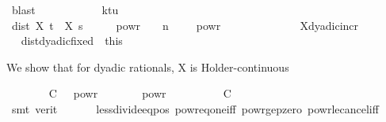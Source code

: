\begin{isabellebody}
\ blast\isanewline
\ \ \ \ \ \ \ \ \isamarkupfalse%
\ \isamarkupfalse%
\ {\isachardoublequoteopen}k{\isacharunderscore}{\kern0pt}tu\ {\isacharequal}{\kern0pt}\ {}{\isachardoublequoteclose}\ \isamarkupfalse%
\isanewline
\ \ \ \ \ \ \ \ \isamarkupfalse%
\ {\isachardoublequoteopen}dist\ {\isacharparenleft}{\kern0pt}X\ t\ {\isasymomega}{\isacharparenright}{\kern0pt}\ {\isacharparenleft}{\kern0pt}X\ s\ {\isasymomega}{\isacharparenright}{\kern0pt}\ {\isasymle}\ {}\ {\isacharasterisk}{\kern0pt}\ {}\ powr\ {\isacharparenleft}{\kern0pt}{\isacharminus}{\kern0pt}\ {\isasymgamma}\ {\isacharasterisk}{\kern0pt}\ n{\isacharparenright}{\kern0pt}\ {\isacharslash}{\kern0pt}\ {\isacharparenleft}{\kern0pt}{}\ {\isacharminus}{\kern0pt}\ {}\ powr\ {\isacharminus}{\kern0pt}\ {\isasymgamma}{\isacharparenright}{\kern0pt}{\isachardoublequoteclose}\isanewline
\ \ \ \ \ \ \ \ \ \ \isamarkupfalse%
\ X{\isacharunderscore}{\kern0pt}dyadic{\isacharunderscore}{\kern0pt}incr\ \isamarkupfalse%
\isanewline
\ \ \ \ \ \ \isacommand{{\isacharbraceright}{\kern0pt}}\isamarkupfalse%
\ \isamarkupfalse%
\ dist{\isacharunderscore}{\kern0pt}dyadic{\isacharunderscore}{\kern0pt}fixed\ {\isacharequal}{\kern0pt}\ this%
\begin{isamarkuptext}%
We show that for dyadic rationals, X is Holder-continuous%
\end{isamarkuptext}\isamarkuptrue%
\ \ \ \ \ \ \isamarkupfalse%
\ {\isacharquery}{\kern0pt}C\ {\isacharequal}{\kern0pt}\ {\isachardoublequoteopen}{}\ powr\ {\isacharparenleft}{\kern0pt}{}\ {\isacharplus}{\kern0pt}\ {\isasymgamma}{\isacharparenright}{\kern0pt}\ {\isacharslash}{\kern0pt}\ {\isacharparenleft}{\kern0pt}{}\ {\isacharminus}{\kern0pt}\ {}\ powr\ {\isacharminus}{\kern0pt}\ {\isasymgamma}{\isacharparenright}{\kern0pt}{\isachardoublequoteclose}\isanewline
\ \ \ \ \ \ \isamarkupfalse%
\ {\isachardoublequoteopen}{\isacharquery}{\kern0pt}C\ {\isachargreater}{\kern0pt}\ {}{\isachardoublequoteclose}\isanewline
\ \ \ \ \ \ \ \ \isamarkupfalse%
\ {\isacharparenleft}{\kern0pt}smt\ {\isacharparenleft}{\kern0pt}verit{\isacharparenright}{\kern0pt}\ {\isacartoucheopen}{\isasymgamma}\ {\isachargreater}{\kern0pt}\ {}{\isacartoucheclose}\ {\isacartoucheopen}{\isasymgamma}\ {\isacharless}{\kern0pt}\ {}{\isacartoucheclose}\ less{\isacharunderscore}{\kern0pt}divide{\isacharunderscore}{\kern0pt}eq{\isacharunderscore}{\kern0pt}{}{\isacharunderscore}{\kern0pt}pos\ powr{\isacharunderscore}{\kern0pt}eq{\isacharunderscore}{\kern0pt}one{\isacharunderscore}{\kern0pt}iff\ powr{\isacharunderscore}{\kern0pt}ge{\isacharunderscore}{\kern0pt}pzero\ powr{\isacharunderscore}{\kern0pt}le{\isacharunderscore}{\kern0pt}cancel{\isacharunderscore}{\kern0pt}iff{\isacharparenright}{\kern0pt}\isanewline

\end{isabellebody}
